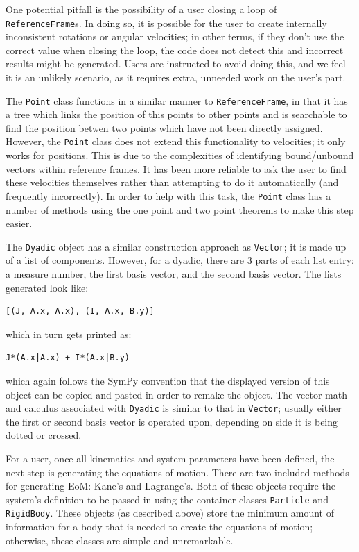 \documentclass[twocolumn,10pt]{asme2e}
\begin{document}
One potential pitfall is the possibility of a user closing a loop of
\verb|ReferenceFrame|s.
In doing so, it is possible for the user to create internally inconsistent
rotations or angular velocities; in other terms, if they don't use the correct
value when closing the loop, the code does not detect this and incorrect
results might be generated.
Users are instructed to avoid doing this, and we feel it is an unlikely
scenario, as it requires extra, unneeded work on the user's part.

The \verb|Point| class functions in a similar manner to \verb|ReferenceFrame|,
in that it has a tree which links the position of this points to other points
and is searchable to find the position betwen two points which have not been
directly assigned.
However, the \verb|Point| class does not extend this functionality to
velocities; it only works for positions.
This is due to the complexities of identifying bound/unbound vectors within
reference frames.
It has been more reliable to ask the user to find these velocities themselves
rather than attempting to do it automatically (and frequently incorrectly).
In order to help with this task, the \verb|Point| class has a number of methods
using the one point and two point theorems \cite{Kane1985} to make this step
easier.

The \verb|Dyadic| object has a similar construction approach as \verb|Vector|;
it is made up of a list of components.
However, for a dyadic, there are 3 parts of each list entry: a measure number,
the first basis vector, and the second basis vector.
The lists generated look like:
\begin{verbatim}
[(J, A.x, A.x), (I, A.x, B.y)]
\end{verbatim}
which in turn gets printed as:
\begin{verbatim}
J*(A.x|A.x) + I*(A.x|B.y)
\end{verbatim}
which again follows the SymPy convention that the displayed version of this
object can be copied and pasted in order to remake the object.
The vector math and calculus associated with \verb|Dyadic| is similar to that
in \verb|Vector|; usually either the first or second basis vector is operated
upon, depending on side it is being dotted or crossed.

For a user, once all kinematics and system parameters have been defined, the
next step is generating the equations of motion.
There are two included methods for generating EoM: Kane's and Lagrange's.
Both of these objects require the system's definition to be passed in using the
container classes \verb|Particle| and \verb|RigidBody|.
These objects (as described above) store the minimum amount of information for
a body that is needed to create the equations of motion; otherwise, these
classes are simple and unremarkable.
\end{document}
